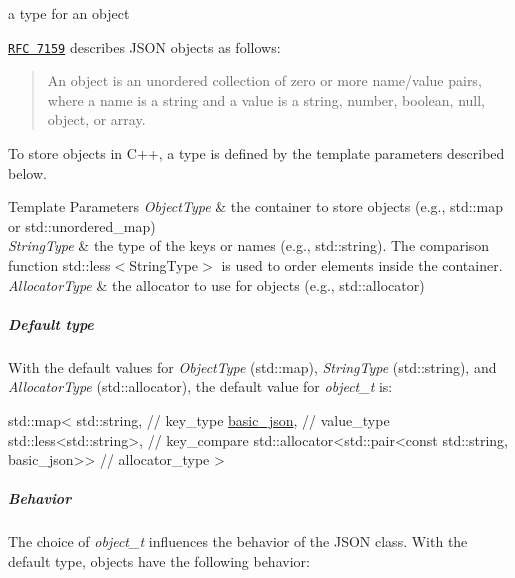 a type for an object 

\href{http://rfc7159.net/rfc7159}{\tt R\+FC 7159} describes J\+S\+ON objects as follows\+: \begin{quote}
An object is an unordered collection of zero or more name/value pairs, where a name is a string and a value is a string, number, boolean, null, object, or array. \end{quote}


To store objects in C++, a type is defined by the template parameters described below.


\begin{DoxyTemplParams}{Template Parameters}
{\em Object\+Type} & the container to store objects (e.\+g., {\ttfamily std\+::map} or {\ttfamily std\+::unordered\+\_\+map}) \\
\hline
{\em String\+Type} & the type of the keys or names (e.\+g., {\ttfamily std\+::string}). The comparison function {\ttfamily std\+::less$<$String\+Type$>$} is used to order elements inside the container. \\
\hline
{\em Allocator\+Type} & the allocator to use for objects (e.\+g., {\ttfamily std\+::allocator})\\
\hline
\end{DoxyTemplParams}
\subparagraph*{Default type}

With the default values for {\itshape Object\+Type} ({\ttfamily std\+::map}), {\itshape String\+Type} ({\ttfamily std\+::string}), and {\itshape Allocator\+Type} ({\ttfamily std\+::allocator}), the default value for {\itshape object\+\_\+t} is\+:


\begin{DoxyCode}
std::map<
  std::string, \textcolor{comment}{// key\_type}
  \hyperlink{classnlohmann_1_1basic__json_aed115142bd0c6c66c864700e0467df55}{basic\_json}, \textcolor{comment}{// value\_type}
  std::less<std::string>, \textcolor{comment}{// key\_compare}
  std::allocator<std::pair<const std::string, basic\_json>> \textcolor{comment}{// allocator\_type}
>
\end{DoxyCode}


\subparagraph*{Behavior}

The choice of {\itshape object\+\_\+t} influences the behavior of the J\+S\+ON class. With the default type, objects have the following behavior\+:


